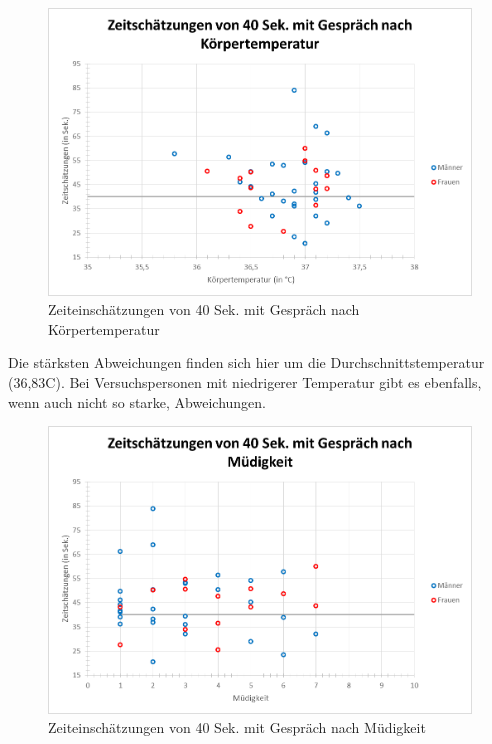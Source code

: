 \documentclass{Paper}
\begin{document}
\begin{figure}[H]
	\centering
	\includegraphics[scale=0.7]{../Diagramme/scatterPre/40mit_koerpertemperatur.png}
	\caption{Zeiteinschätzungen von 40 Sek. mit Gespräch nach Körpertemperatur}
	\label{img:temp40mit}
\end{figure}

Die stärksten Abweichungen finden sich hier um die Durchschnittstemperatur (36,83\textdegree C).  Bei Versuchspersonen mit niedrigerer Temperatur gibt es ebenfalls, wenn auch nicht so starke, Abweichungen.


\begin{figure}[H]
	\centering
	\includegraphics[scale=0.7]{../Diagramme/scatterPre/40mit_muedigkeit.png}
	\caption{Zeiteinschätzungen von 40 Sek. mit Gespräch nach Müdigkeit}
	\label{img:mued40mit}
\end{figure}
\end{document}

